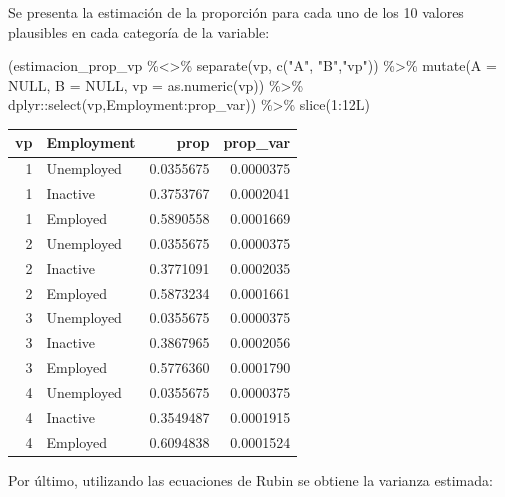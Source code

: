 \documentclass[
  12pt,
]{book}
\newenvironment{Shaded}{\begin{snugshade}}{\end{snugshade}}
\newcommand{\AttributeTok}[1]{\textcolor[rgb]{0.77,0.63,0.00}{#1}}
\newcommand{\ConstantTok}[1]{\textcolor[rgb]{0.00,0.00,0.00}{#1}}
\newcommand{\DecValTok}[1]{\textcolor[rgb]{0.00,0.00,0.81}{#1}}
\newcommand{\FunctionTok}[1]{\textcolor[rgb]{0.00,0.00,0.00}{#1}}
\newcommand{\NormalTok}[1]{#1}
\newcommand{\SpecialCharTok}[1]{\textcolor[rgb]{0.00,0.00,0.00}{#1}}
\newcommand{\StringTok}[1]{\textcolor[rgb]{0.31,0.60,0.02}{#1}}
\begin{document}
Se presenta la estimación de la proporción para cada uno de los 10 valores plausibles en cada categoría de la variable:

\begin{Shaded}
\begin{Highlighting}[]
\NormalTok{(estimacion\_prop\_vp }\SpecialCharTok{\%\textless{}\textgreater{}\%} \FunctionTok{separate}\NormalTok{(vp, }\FunctionTok{c}\NormalTok{(}\StringTok{"A"}\NormalTok{, }\StringTok{"B"}\NormalTok{,}\StringTok{"vp"}\NormalTok{)) }\SpecialCharTok{\%\textgreater{}\%} 
\FunctionTok{mutate}\NormalTok{(}\AttributeTok{A =} \ConstantTok{NULL}\NormalTok{, }\AttributeTok{B =} \ConstantTok{NULL}\NormalTok{, }\AttributeTok{vp =} \FunctionTok{as.numeric}\NormalTok{(vp)) }\SpecialCharTok{\%\textgreater{}\%}
\NormalTok{  dplyr}\SpecialCharTok{::}\FunctionTok{select}\NormalTok{(vp,Employment}\SpecialCharTok{:}\NormalTok{prop\_var)) }\SpecialCharTok{\%\textgreater{}\%} \FunctionTok{slice}\NormalTok{(}\DecValTok{1}\SpecialCharTok{:}\NormalTok{12L)}
\end{Highlighting}
\end{Shaded}

\begin{tabular}{r|l|r|r}
\hline
vp & Employment & prop & prop\_var\\
\hline
1 & Unemployed & 0.0355675 & 0.0000375\\
\hline
1 & Inactive & 0.3753767 & 0.0002041\\
\hline
1 & Employed & 0.5890558 & 0.0001669\\
\hline
2 & Unemployed & 0.0355675 & 0.0000375\\
\hline
2 & Inactive & 0.3771091 & 0.0002035\\
\hline
2 & Employed & 0.5873234 & 0.0001661\\
\hline
3 & Unemployed & 0.0355675 & 0.0000375\\
\hline
3 & Inactive & 0.3867965 & 0.0002056\\
\hline
3 & Employed & 0.5776360 & 0.0001790\\
\hline
4 & Unemployed & 0.0355675 & 0.0000375\\
\hline
4 & Inactive & 0.3549487 & 0.0001915\\
\hline
4 & Employed & 0.6094838 & 0.0001524\\
\hline
\end{tabular}

Por último, utilizando las ecuaciones de Rubin se obtiene la varianza estimada:
\end{document}
